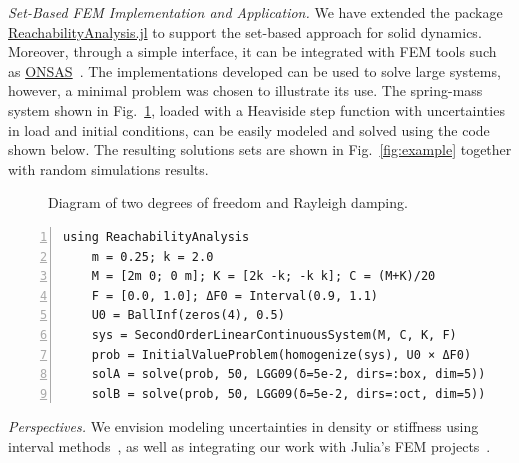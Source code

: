 \documentclass{juliacon}
\begin{document}
\emph{Set-Based FEM Implementation and Application.} %
%
We have extended the package \href{http://github.com/JuliaReach/ReachabilityAnalysis.jl}{ReachabilityAnalysis.jl}\cite{ReachabilityAnalysis} to support the set-based approach for solid dynamics. %
%
Moreover, through a simple interface, it can be integrated with FEM tools such as \href{http://www.onsas.org}{ONSAS}~\cite{onsas}.
%
The implementations developed can be used to solve large systems, however, a minimal problem was chosen to illustrate its use. %
%
The spring-mass system shown in Fig.~\ref{fig:diagram}, loaded with a Heaviside step function with uncertainties in load and initial conditions, can be easily modeled and solved using the code shown below. %
%
The resulting solutions sets are shown in Fig.~\ref{fig:example} together with random simulations results.

\begin{figure}[htb]
	\centering
	\def\svgwidth{0.26\textwidth}
	
	\caption{Diagram of two degrees of freedom and Rayleigh damping.}
	\label{fig:diagram}
\end{figure}



\begin{lstlisting}[label=ejemplo, numbers=left, aboveskip=0.55cm, belowskip=0.5cm]
	using ReachabilityAnalysis
	m = 0.25; k = 2.0
	M = [2m 0; 0 m]; K = [2k -k; -k k]; C = (M+K)/20
	F = [0.0, 1.0]; ΔF0 = Interval(0.9, 1.1)
	U0 = BallInf(zeros(4), 0.5)
	sys = SecondOrderLinearContinuousSystem(M, C, K, F)
	prob = InitialValueProblem(homogenize(sys), U0 × ΔF0)
	solA = solve(prob, 50, LGG09(δ=5e-2, dirs=:box, dim=5))
	solB = solve(prob, 50, LGG09(δ=5e-2, dirs=:oct, dim=5))
\end{lstlisting}

\noindent \emph{Perspectives.} We envision modeling uncertainties in density or stiffness using interval methods~\cite{forets2021intervalmat, ferranti2021interval}, as well as integrating our work with Julia's FEM projects~\cite{Gridap,Ferrite,FinEtools}.

\vspace{-2mm}
\end{document}
